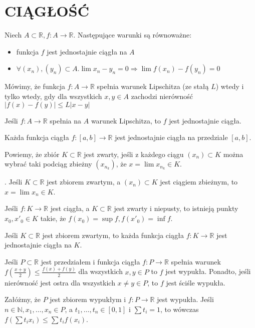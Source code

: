 \documentclass[12pt]{article}
\newcommand{\N}{\mathbb{N}}
\newcommand{\R}{\mathbb{R}}
\begin{document}
\section*{CIĄGŁOŚĆ}

\theorem{}
Niech $A \subset \R, f : A \rightarrow \R$. Następujące warunki są równoważne:
\begin{itemize}
    \item funkcja $f$ jest jednostajnie ciągła na $A$
    \item $\forall (x_n),(y_n) \subset A . \lim x_n - y_n = 0 \Rightarrow \lim f(x_n) - f(y_n) = 0$
\end{itemize}


Mówimy, że funkcja $f : A \rightarrow \R$ spełnia warunek Lipschitza (ze stałą $L$) wtedy i tylko wtedy, gdy dla wszystkich $x, y \in A$ zachodzi nierówność $|f(x) - f(y)| \leq L|x - y|$

\theorem{}
Jeśli $f : A \rightarrow \R$ spełnia na $A$ warunek Lipschitza, to $f$ jest jednostajnie ciągła.

Każda funkcja ciągła $f : [a, b] \rightarrow \R$ jest jednostajnie ciągła na przedziale $[a, b]$.

Powiemy, że zbiór $K \subset \R$ jest zwarty, jeśli z każdego
ciągu $(x_n) \subset K$ można wybrać taki podciąg zbieżny $(x_{n_k})$, że $x = \lim x_{n_k} \in K$.

\theorem{} . Jeśli $K \subset \R$ jest zbiorem zwartym, a $(x_n) \subset K$ jest ciągiem zbieżnym, to $x = \lim x_n \in K$.

Jeśli $f : K \rightarrow \R$ jest ciągła, a $K \subset \R$ jest zwarty i niepusty, to istnieją punkty $x_0, x'_0 \in K$ takie, że
$f(x_0) = \sup f, f(x'_0) = \inf f$.

Jeśli $K \subset \R$ jest zbiorem zwartym, to każda funkcja ciągła $f : K \rightarrow \R$ jest jednostajnie ciągła na $K$.


Jeśli $P \subset \R$ jest przedziałem i funkcja ciągła $f : P \rightarrow \R$ spełnia warunek
$f(\frac{x + y}{2}) \leq \frac{f(x) + f(y)}{2}$ dla wszystkich $x, y \in P$
to $f$ jest wypukła. Ponadto, jeśli nierówność jest ostra dla wszystkich $x \neq y \in P$, to $f$
jest ściśle wypukła.

Załóżmy, że $P$ jest zbiorem wypukłym i $f : P \rightarrow \R$ jest wypukła.
Jeśli $n \in \N, x_1, \ldots , x_n \in P$, a $t_1, \ldots , t_n \in [0, 1]$ i
$\sum t_i = 1$, to wówczas $f(\sum t_ix_i) \leq \sum t_if(x_i)$.
\end{document}
